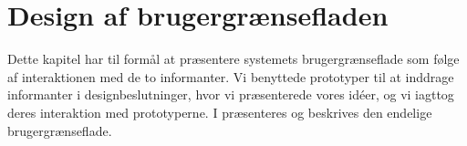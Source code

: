 \chapter{Design af brugergrænsefladen}
\label{chap:designafbrugergraenseflade}

Dette kapitel har til formål at præsentere systemets brugergrænseflade som følge af interaktionen med de to informanter. Vi benyttede prototyper til at inddrage informanter i designbeslutninger, hvor vi præsenterede vores idéer, og vi iagttog deres interaktion med prototyperne. I  præsenteres og beskrives den endelige brugergrænseflade.


